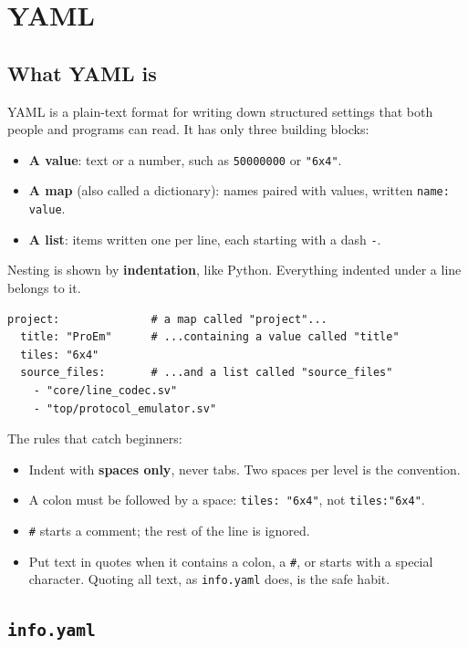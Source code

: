 \documentclass[11pt,a4paper]{article}
\newcommand{\file}[1]{\texttt{#1}}
\begin{document}
\section{YAML}\label{sec:yaml}

\subsection{What YAML is}

YAML is a plain-text format for writing down structured settings that both people and programs can read. It has only three building blocks:

\begin{itemize}
\item \textbf{A value}: text or a number, such as \texttt{50000000} or \texttt{"6x4"}.
\item \textbf{A map} (also called a dictionary): names paired with values, written \texttt{name: value}.
\item \textbf{A list}: items written one per line, each starting with a dash \texttt{-}.
\end{itemize}

Nesting is shown by \textbf{indentation}, like Python. Everything indented under a line belongs to it.

\begin{lstlisting}
project:              # a map called "project"...
  title: "ProEm"      # ...containing a value called "title"
  tiles: "6x4"
  source_files:       # ...and a list called "source_files"
    - "core/line_codec.sv"
    - "top/protocol_emulator.sv"
\end{lstlisting}

The rules that catch beginners:
\begin{itemize}
\item Indent with \textbf{spaces only}, never tabs. Two spaces per level is the convention.
\item A colon must be followed by a space: \texttt{tiles: "6x4"}, not \texttt{tiles:"6x4"}.
\item \texttt{\#} starts a comment; the rest of the line is ignored.
\item Put text in quotes when it contains a colon, a \texttt{\#}, or starts with a special character. Quoting all text, as \file{info.yaml} does, is the safe habit.
\end{itemize}

\subsection{\file{info.yaml}}
\end{document}
